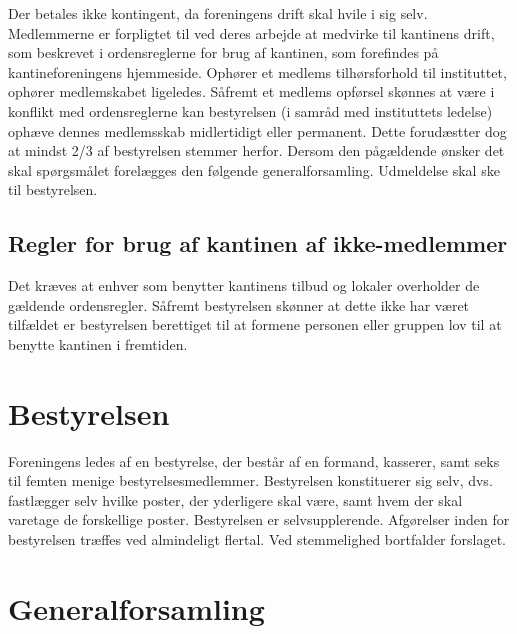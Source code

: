 \documentclass[a4paper, 10pt]{article}
\begin{document}
Der betales ikke kontingent, da foreningens drift skal hvile i sig
selv. Medlemmerne er forpligtet til ved deres arbejde at medvirke til
kantinens drift, som beskrevet i ordensreglerne for brug af kantinen,
som forefindes på kantineforeningens hjemmeside.  Ophører et medlems
tilhørsforhold til instituttet, ophører medlemskabet ligeledes.
Såfremt et medlems opførsel skønnes at være i konflikt med
ordensreglerne kan bestyrelsen (i samråd med instituttets le\-delse)
ophæve dennes medlemsskab midlertidigt eller permanent. Dette
forudæstter dog at mindst 2/3 af bestyrelsen stemmer herfor. Dersom
den pågældende ønsker det skal spørgsmålet forelægges den følgende
generalforsamling. Udmeldelse skal ske til bestyrelsen.

\subsection{Regler for brug af kantinen af ikke-medlemmer}

Det kræves at enhver som benytter kantinens tilbud og lokaler
overholder de gældende ordensregler. Såfremt bestyrelsen skønner at
dette ikke har været tilfældet er bestyrelsen berettiget til at
formene personen eller gruppen lov til at benytte kantinen i
fremtiden.

\section{Bestyrelsen}

Foreningens ledes af en bestyrelse, der består af en formand,
kasserer, samt seks til femten menige bestyrelsesmedlemmer.
Bestyrelsen konstituerer sig selv, dvs. fastlægger selv hvilke poster,
der yderligere skal være, samt hvem der skal varetage de forskellige
poster. Bestyre\-lsen er selvsupplerende. Afgørelser inden for
bestyrelsen træffes ved almindeligt flertal. Ved stemmelighed
bortfalder forslaget.

\section{Generalforsamling}
\end{document}
